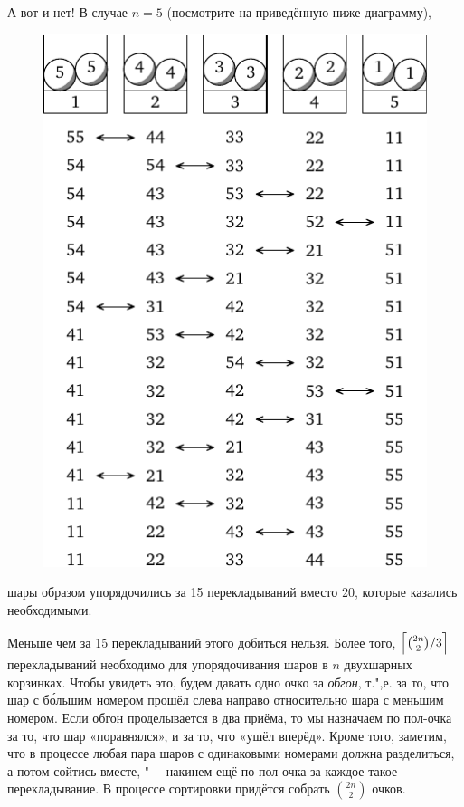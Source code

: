 \documentclass[twoside]{book}
\begin{document}
А вот и нет!
В случае $n = 5$ (посмотрите на приведённую ниже диаграмму),
\begin{figure}[!ht]
\centering
\includegraphics{mp/wink-280}
\end{figure}
шары  образом упорядочились за 15 перекладываний вместо 20, которые казались необходимыми.

Меньше чем за 15 перекладываний этого добиться нельзя.
Более того, $\Bigl\lceil\binom{2n}{2}/3\Bigr\rceil$ перекладываний необходимо для упорядочивания шаров в $n$ двухшарных корзинках.
Чтобы увидеть это, будем давать одно очко за \emph{обгон}, т.",е. за то, что шар с б\'{о}льшим номером прошёл слева направо относительно шара с меньшим номером.
Если обгон проделывается в два приёма, то мы назначаем по пол-очка за то, что шар «поравнялся», и за то, что «ушёл вперёд».
Кроме того, заметим, что в процессе любая пара шаров с одинаковыми номерами должна разделиться, а потом сойтись вместе, "--- накинем ещё по пол-очка за каждое такое перекладывание. 
В процессе сортировки придётся собрать $\binom{2n}2$ очков.
\end{document}
